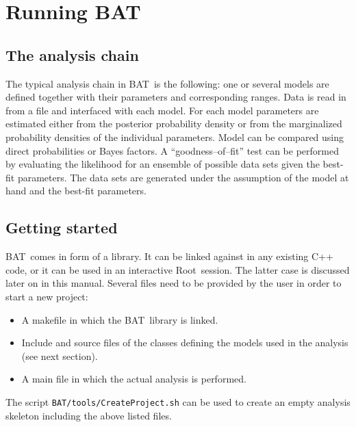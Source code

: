 \documentclass[11pt, a4paper]{article}
\newcommand{\bat}{{\sc BAT}}
\newcommand{\Root}{{\sc Root}}
\begin{document}
\pagebreak  

\section{Running \bat}
\label{section:running}

\subsection{The analysis chain} 
\label{subsection:chain}

The typical analysis chain in \bat\ is the following: one or several
models are defined together with their parameters and corresponding
ranges. Data is read in from a file and interfaced with each
model. For each model parameters are estimated either from the
posterior probability density or from the marginalized probability
densities of the individual parameters. Model can be compared using
direct probabilities or Bayes factors. A ``goodness--of--fit'' test
can be performed by evaluating the likelihood for an ensemble of
possible data sets given the best-fit parameters. The data sets are
generated under the assumption of the model at hand and the best-fit
parameters. \\


\subsection{Getting started} 
\label{subsection:start}

\bat\ comes in form of a library. It can be linked against in any
existing C++ code, or it can be used in an interactive
\Root\ session. The latter case is discussed later on in this
manual. Several files need to be provided by the user in order to
start a new project:
% 
\begin{itemize}
\item A makefile in which the \bat\ library is linked. 
\item Include and source files of the classes defining the models
used in the analysis (see next section). 
\item A main file in which the actual analysis is performed. 
\end{itemize} 
%
The script \verb|BAT/tools/CreateProject.sh| can be used to create an
empty analysis skeleton including the above listed files.
\end{document}
